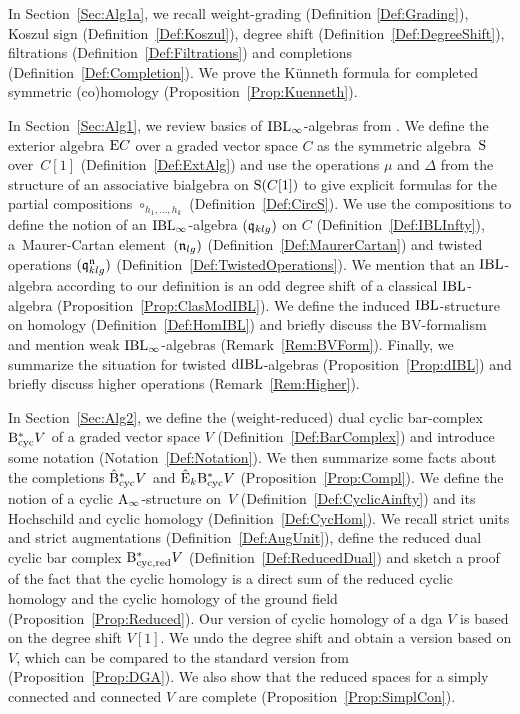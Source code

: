 \documentclass[\MainFolder/Text.tex]{subfiles}
\begin{document}
\label{Sec:Alg0}

In Section~\ref{Sec:Alg1a}, we recall weight-grading (Definition \ref{Def:Grading}), Koszul sign (Definition~\ref{Def:Koszul}), degree shift (Definition~\ref{Def:DegreeShift}), filtrations (Definition~\ref{Def:Filtrations}) and completions (Definition~\ref{Def:Completion}).
We prove the K\"unneth formula for completed symmetric (co)homology (Proposition~\ref{Prop:Kuenneth}).

In Section~\ref{Sec:Alg1}, we review basics of $\mathrm{IBL}_\infty$-algebras from \cite{Cieliebak2015}.
We define the exterior algebra $\mathrm{E} C$ over a graded vector space $C$ as the symmetric algebra~$\mathrm{S}$ over~$C[1]$ (Definition~\ref{Def:ExtAlg}) and use the operations $\mu$ and $\Delta$ from the structure of an associative bialgebra on $\mathrm{S}(C[1])$ to give explicit formulas for the partial compositions $\circ_{h_1, \dotsc, h_k}$  (Definition~\ref{Def:CircS}).
We use the compositions to define the notion of an $\mathrm{IBL}_\infty$-algebra $(\mathfrak{q}_{klg})$ on $C$ (Definition~\ref{Def:IBLInfty}), a~Maurer-Cartan element~$(\mathfrak{n}_{lg})$ (Definition~\ref{Def:MaurerCartan}) and twisted operations $(\mathfrak{q}_{klg}^{\mathfrak{n}})$ (Definition~\ref{Def:TwistedOperations}).
We mention that an $\mathrm{IBL}$-algebra according to our definition is an odd degree shift of a classical $\mathrm{IBL}$-algebra (Proposition~\ref{Prop:ClasModIBL}).
We define the induced $\mathrm{IBL}$-structure on homology (Definition~\ref{Def:HomIBL}) and briefly discuss the $\mathrm{BV}$-formalism and mention weak $\mathrm{IBL}_\infty$-algebras (Remark~\ref{Rem:BVForm}).
Finally, we summarize the situation for twisted $\mathrm{dIBL}$-algebras (Proposition~\ref{Prop:dIBL}) and briefly discuss higher operations (Remark~\ref{Rem:Higher}).

In Section~\ref{Sec:Alg2}, we define the (weight-reduced) dual cyclic bar-complex $\mathrm{B}_{\mathrm{cyc}}^* V$ of a graded vector space $V$ (Definition~\ref{Def:BarComplex}) and introduce some notation (Notation~\ref{Def:Notation}).
We then summarize some facts about the completions $\hat{\mathrm{B}}_{\mathrm{cyc}}^* V$ and $\hat{\mathrm{E}}_k \mathrm{B}_{\mathrm{cyc}}^* V$ (Proposition~\ref{Prop:Compl}).
We define the notion of a cyclic $\mathrm{A}_\infty$-structure on~$V$ (Definition~\ref{Def:CyclicAinfty}) and its Hochschild and cyclic homology (Definition~\ref{Def:CycHom}).
We recall strict units and strict augmentations (Definition~\ref{Def:AugUnit}), define the reduced dual cyclic bar complex $\mathrm{B}_{\mathrm{cyc},\mathrm{red}}^* V$ (Definition~\ref{Def:ReducedDual}) and sketch a proof of the fact that the cyclic homology is a direct sum of the reduced cyclic homology and the cyclic homology of the ground field (Proposition~\ref{Prop:Reduced}).
Our version of cyclic homology of a dga $V$ is based on the degree shift $V[1]$.
We undo the degree shift and obtain a version based on $V$, which can be compared to the standard version from~\cite{LodayCyclic} (Proposition~\ref{Prop:DGA}).
We also show that the reduced spaces for a simply connected and connected $V$ are complete (Proposition~\ref{Prop:SimplCon}).
\end{document}
